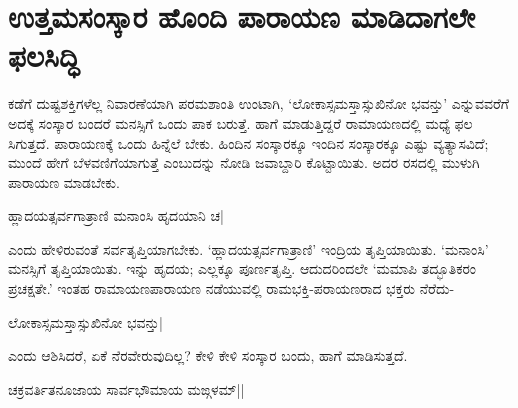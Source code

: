 \section*{ಉತ್ತಮಸಂಸ್ಕಾರ ಹೊಂದಿ ಪಾರಾಯಣ ಮಾಡಿದಾಗಲೇ ಫಲಸಿದ್ಧಿ} 

ಕಡೆಗೆ ದುಷ್ಟಶಕ್ತಿಗಳೆಲ್ಲ ನಿವಾರಣೆಯಾಗಿ ಪರಮಶಾಂತಿ ಉಂಟಾಗಿ, `ಲೋಕಾಸ್ಸಮಸ್ತಾಸ್ಸುಖಿನೋ ಭವನ್ತು' ಎನ್ನುವವರೆಗೆ ಅದಕ್ಕೆ ಸಂಸ್ಕಾರ ಬಂದರೆ ಮನಸ್ಸಿಗೆ ಒಂದು ಪಾಕ ಬರುತ್ತೆ. ಹಾಗೆ ಮಾಡುತ್ತಿದ್ದರೆ ರಾಮಾಯಣದಲ್ಲಿ ಮಧ್ಯೆ ಫಲ ಸಿಗುತ್ತದೆ. ಪಾರಾಯಣಕ್ಕೆ ಒಂದು ಹಿನ್ನೆಲೆ ಬೇಕು. ಹಿಂದಿನ ಸಂಸ್ಕಾರಕ್ಕೂ ಇಂದಿನ ಸಂಸ್ಕಾರಕ್ಕೂ ಎಷ್ಟು ವ್ಯತ್ಯಾಸವಿದೆ; ಮುಂದೆ ಹೇಗೆ ಬೆಳವಣಿಗೆಯಾಗುತ್ತೆ ಎಂಬುದನ್ನು ನೋಡಿ ಜವಾಬ್ದಾರಿ ಕೊಟ್ಟಾಯಿತು. ಅದರ ರಸದಲ್ಲಿ ಮುಳುಗಿ ಪಾರಾಯಣ ಮಾಡಬೇಕು. 


\begin{shloka} 
ಹ್ಲಾದಯತ್ಸರ್ವಗಾತ್ರಾಣಿ ಮನಾಂಸಿ ಹೃದಯಾನಿ ಚ| 
\end{shloka}

ಎಂದು ಹೇಳಿರುವಂತೆ ಸರ್ವತೃಪ್ತಿಯಾಗಬೇಕು. `ಹ್ಲಾದಯತ್ಸರ್ವಗಾತ್ರಾಣಿ' ಇಂದ್ರಿಯ ತೃಪ್ತಿಯಾಯಿತು. `ಮನಾಂಸಿ' ಮನಸ್ಸಿಗೆ ತೃಪ್ತಿಯಾಯಿತು. ಇನ್ನು ಹೃದಯ; ಎಲ್ಲಕ್ಕೂ ಪೂರ್ಣತೃಪ್ತಿ. ಆದುದರಿಂದಲೇ `ಮಮಾಪಿ ತದ್ಭೂತಿಕರಂ ಪ್ರಚಕ್ಷತೇ.' ಇಂತಹ ರಾಮಾಯಣಪಾರಾಯಣ ನಡೆಯುವಲ್ಲಿ ರಾಮಭಕ್ತಿ-ಪರಾಯಣರಾದ ಭಕ್ತರು ನೆರೆದು- 

\begin{shloka} 
ಲೋಕಾಸ್ಸಮಸ್ತಾಸ್ಸುಖಿನೋ ಭವನ್ತು|
\end{shloka}
ಎಂದು ಆಶಿಸಿದರೆ, ಏಕೆ ನೆರವೇರುವುದಿಲ್ಲ? ಕೇಳಿ ಕೇಳಿ ಸಂಸ್ಕಾರ ಬಂದು, ಹಾಗೆ ಮಾಡಿಸುತ್ತದೆ. 

\begin{shloka} 
ಚಕ್ರವರ್ತಿತನೂಜಾಯ ಸಾರ್ವಭೌಮಾಯ ಮಙ್ಗಳಮ್‍||
\end{shloka}
